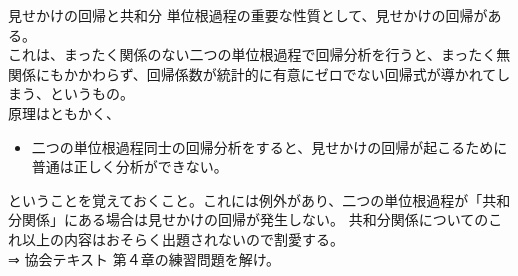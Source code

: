 \documentclass[dvipdfmx,autodetect-engine, unicode, 10pt, aspectratio=169]{beamer}
\begin{document}
\begin{frame}{見せかけの回帰と共和分}
    単位根過程の重要な性質として、見せかけの回帰がある。\\
    これは、まったく関係のない二つの単位根過程で回帰分析を行うと、まったく無関係にもかかわらず、回帰係数が統計的に有意にゼロでない回帰式が導かれてしまう、というもの。\\
    原理はともかく、
    \begin{itemize}
        \item 二つの単位根過程同士の回帰分析をすると、見せかけの回帰が起こるために普通は正しく分析ができない。
    \end{itemize}
    ということを覚えておくこと。これには例外があり、二つの単位根過程が「共和分関係」にある場合は見せかけの回帰が発生しない。
    共和分関係についてのこれ以上の内容はおそらく出題されないので割愛する。\\
    \vspace{10pt}
    ⇒ 協会テキスト 第４章の練習問題を解け。
\end{frame}
\end{document}
